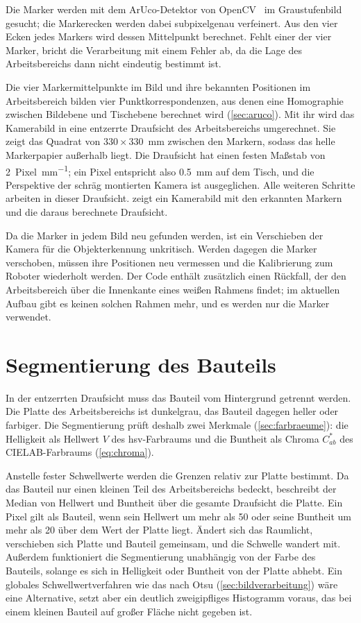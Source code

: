 Die Marker werden mit dem ArUco-Detektor von OpenCV~\cite{bradski2000opencv} im
Graustufenbild gesucht; die Markerecken werden dabei subpixelgenau verfeinert. Aus den vier
Ecken jedes Markers wird dessen Mittelpunkt berechnet. Fehlt einer der vier Marker, bricht
die Verarbeitung mit einem Fehler ab, da die Lage des Arbeitsbereichs dann nicht eindeutig
bestimmt ist.

Die vier Markermittelpunkte im Bild und ihre bekannten Positionen im Arbeitsbereich bilden
vier Punktkorrespondenzen, aus denen eine Homographie zwischen Bildebene und Tischebene
berechnet wird (\cref{sec:aruco}). Mit ihr wird das Kamerabild in eine entzerrte Draufsicht
des Arbeitsbereichs umgerechnet. Sie zeigt das Quadrat von $330 \times 330$~\si{\milli\metre}
zwischen den Markern, sodass das helle Markerpapier außerhalb liegt. Die Draufsicht hat einen
festen Maßstab von \SI{2}{Pixel\per\milli\metre}; ein Pixel entspricht also
\SI{0,5}{\milli\metre} auf dem Tisch, und die Perspektive der schräg montierten Kamera ist
ausgeglichen. Alle weiteren Schritte arbeiten in dieser Draufsicht.  zeigt
ein Kamerabild mit den erkannten Markern und die daraus berechnete Draufsicht.

Da die Marker in jedem Bild neu gefunden werden, ist ein Verschieben der Kamera für die
Objekterkennung unkritisch. Werden dagegen die Marker verschoben, müssen ihre Positionen neu
vermessen und die Kalibrierung zum Roboter wiederholt werden. Der Code enthält zusätzlich
einen Rückfall, der den Arbeitsbereich über die Innenkante eines weißen Rahmens findet; im
aktuellen Aufbau gibt es keinen solchen Rahmen mehr, und es werden nur die Marker verwendet.

\section{Segmentierung des Bauteils}
\label{sec:m1-segmentierung}

In der entzerrten Draufsicht muss das Bauteil vom Hintergrund getrennt werden. Die Platte
des Arbeitsbereichs ist dunkelgrau, das Bauteil dagegen heller oder farbiger. Die
Segmentierung prüft deshalb zwei Merkmale (\cref{sec:farbraeume}): die Helligkeit als
Hellwert $V$ des \ac{hsv}-Farbraums und die Buntheit als Chroma $C^*_{ab}$ des
CIELAB-Farbraums (\cref{eq:chroma}).

Anstelle fester Schwellwerte werden die Grenzen relativ zur Platte bestimmt. Da das Bauteil
nur einen kleinen Teil des Arbeitsbereichs bedeckt, beschreibt der Median von Hellwert und
Buntheit über die gesamte Draufsicht die Platte. Ein Pixel gilt als Bauteil, wenn sein
Hellwert um mehr als 50 oder seine Buntheit um mehr als 20 über dem Wert der Platte liegt.
Ändert sich das Raumlicht, verschieben sich Platte und Bauteil gemeinsam, und die Schwelle
wandert mit. Außerdem funktioniert die Segmentierung unabhängig von der Farbe des Bauteils,
solange es sich in Helligkeit oder Buntheit von der Platte abhebt. Ein globales
Schwellwertverfahren wie das nach Otsu (\cref{sec:bildverarbeitung}) wäre eine Alternative,
setzt aber ein deutlich zweigipfliges Histogramm voraus, das bei einem kleinen Bauteil auf
großer Fläche nicht gegeben ist.

